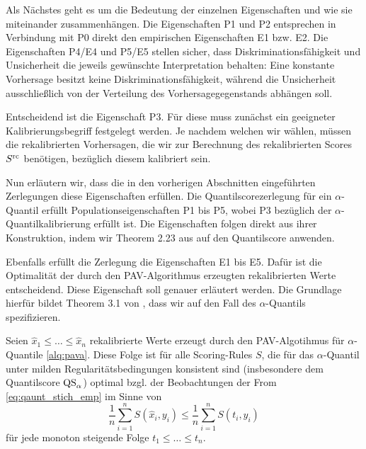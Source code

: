 Als Nächstes geht es um die Bedeutung der einzelnen Eigenschaften und wie sie miteinander zusammenhängen. Die Eigenschaften P1 und P2 entsprechen in Verbindung mit P0 direkt den empirischen Eigenschaften E1 bzw. E2. Die Eigenschaften P4/E4 und P5/E5 stellen sicher, dass Diskriminationsfähigkeit und Unsicherheit die jeweils gewünschte Interpretation behalten: Eine konstante Vorhersage besitzt keine Diskriminationsfähigkeit, während die Unsicherheit ausschließlich von der Verteilung des Vorhersagegegenstands abhängen soll.

Entscheidend ist die Eigenschaft P3. Für diese muss zunächst ein geeigneter Kalibrierungsbegriff festgelegt werden. Je nachdem welchen wir wählen, müssen die rekalibrierten Vorhersagen, die wir zur Berechnung des rekalibrierten Scores $S^{\mathrm{rc}}$ benötigen, bezüglich diesem kalibriert sein. 

Nun erläutern wir, dass die in den vorherigen Abschnitten eingeführten Zerlegungen diese Eigenschaften erfüllen. Die Quantilscorezerlegung für ein $\alpha$-Quantil erfüllt Populationseigenschaften P1 bis P5, wobei P3 bezüglich der $\alpha$-Quantilkalibrierung erfüllt ist. Die Eigenschaften folgen direkt aus ihrer Konstruktion, indem wir Theorem 2.23 aus \textcite{gneiting2023regression} auf den Quantilscore anwenden.

Ebenfalls erfüllt die Zerlegung die Eigenschaften E1 bis E5. Dafür ist die Optimalität der durch den PAV-Algorithmus erzeugten rekalibrierten Werte
entscheidend. Diese Eigenschaft soll genauer erläutert werden. Die Grundlage hierfür bildet Theorem 3.1 von \textcite{gneiting2023regression}, dass wir auf den Fall 
des $\alpha$-Quantils spezifizieren.

\begin{theo}
Seien $\hat x_1 \le \dotsc \le \hat x_n$ rekalibrierte Werte erzeugt durch den PAV-Algotihmus für $\alpha$-Quantile \ref{alq:pava}. Diese Folge ist für alle Scoring-Rules $S$, die für das $\alpha$-Quantil unter milden Regularitätsbedingungen konsistent sind (insbesondere dem Quantilscore $\mathrm{QS}_\alpha$) optimal bzgl. der Beobachtungen der From \ref{eq:qaunt_stich_emp} im Sinne von
\[
\frac{1}{n}\sum_{i=1}^n S(\hat{x}_i,y_i) \leq \frac{1}{n}\sum_{i=1}^n S(t_i,y_i)
\]
für jede monoton steigende Folge \(t_1 \leq \dots \leq t_n\).
\end{theo}

